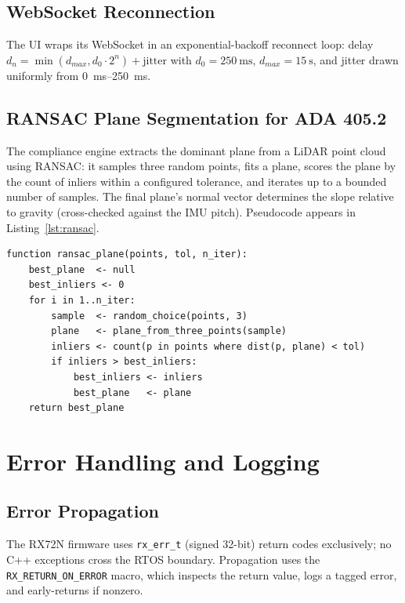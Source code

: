 \documentclass[11pt,letterpaper]{article}
\begin{document}
\subsection{WebSocket Reconnection}
The UI wraps its WebSocket in an exponential-backoff reconnect loop:
delay $d_n = \min(d_{max}, d_0 \cdot 2^n) + \text{jitter}$ with
$d_0 = \qty{250}{\milli\second}$, $d_{max} = \qty{15}{\second}$, and
jitter drawn uniformly from
\qtyrange{0}{250}{\milli\second}.

\subsection{RANSAC Plane Segmentation for ADA 405.2}
The compliance engine extracts the dominant plane from a LiDAR point
cloud using RANSAC: it samples three random points, fits a plane,
scores the plane by the count of inliers within a configured
tolerance, and iterates up to a bounded number of samples. The final
plane's normal vector determines the slope relative to gravity
(cross-checked against the IMU pitch). Pseudocode appears in
Listing~\ref{lst:ransac}.

\begin{lstlisting}[style=pseudocode, caption={RANSAC plane fit for ramp slope.}, label={lst:ransac}]
function ransac_plane(points, tol, n_iter):
    best_plane  <- null
    best_inliers <- 0
    for i in 1..n_iter:
        sample  <- random_choice(points, 3)
        plane   <- plane_from_three_points(sample)
        inliers <- count(p in points where dist(p, plane) < tol)
        if inliers > best_inliers:
            best_inliers <- inliers
            best_plane   <- plane
    return best_plane
\end{lstlisting}

\section{Error Handling and Logging}
\label{sec:errors}

\subsection{Error Propagation}
The RX72N firmware uses \texttt{rx\_err\_t} (signed 32-bit) return
codes exclusively; no C++ exceptions cross the RTOS boundary.
Propagation uses the \texttt{RX\_RETURN\_ON\_ERROR} macro, which
inspects the return value, logs a tagged error, and early-returns
if nonzero.
\end{document}
